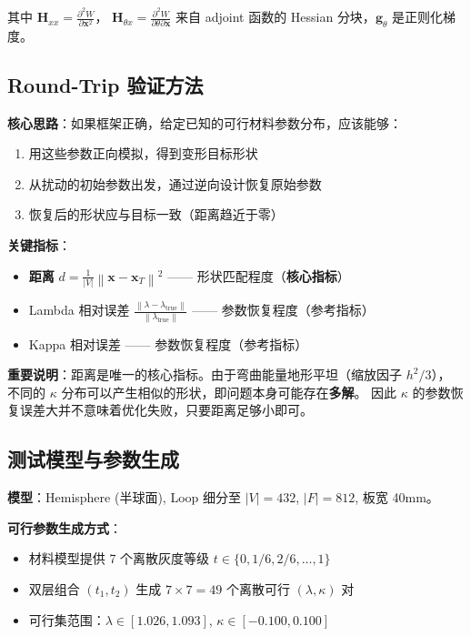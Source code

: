 \documentclass[12pt,a4paper]{article}
\newcommand{\norm}[1]{\left\|#1\right\|}
\begin{document}
其中 $\mathbf{H}_{xx} = \frac{\partial^2 W}{\partial \mathbf{x}^2}$，
$\mathbf{H}_{\theta x} = \frac{\partial^2 W}{\partial \theta \partial \mathbf{x}}$
来自 adjoint 函数的 Hessian 分块，$\mathbf{g}_\theta$ 是正则化梯度。

\subsection{Round-Trip 验证方法}

\textbf{核心思路}：如果框架正确，给定已知的可行材料参数分布，应该能够：
\begin{enumerate}
    \item 用这些参数正向模拟，得到变形目标形状
    \item 从扰动的初始参数出发，通过逆向设计恢复原始参数
    \item 恢复后的形状应与目标一致（距离趋近于零）
\end{enumerate}

\textbf{关键指标}：
\begin{itemize}
    \item \textbf{距离} $d = \frac{1}{|V|}\norm{\mathbf{x} - \mathbf{x}_T}^2$ —— 形状匹配程度（\textbf{核心指标}）
    \item Lambda 相对误差 $\frac{\norm{\lambda - \lambda_\text{true}}}{\norm{\lambda_\text{true}}}$ —— 参数恢复程度（参考指标）
    \item Kappa 相对误差 —— 参数恢复程度（参考指标）
\end{itemize}

\begin{framed}
\noindent \textbf{重要说明}：距离是唯一的核心指标。由于弯曲能量地形平坦（缩放因子 $h^2/3$），
不同的 $\kappa$ 分布可以产生相似的形状，即问题本身可能存在\textbf{多解}。
因此 $\kappa$ 的参数恢复误差大并不意味着优化失败，只要距离足够小即可。
\end{framed}

\subsection{测试模型与参数生成}

\textbf{模型}：Hemisphere (半球面), Loop 细分至 $|V|=432$, $|F|=812$, 板宽 40mm。

\textbf{可行参数生成方式}：
\begin{itemize}
    \item 材料模型提供 7 个离散灰度等级 $t \in \{0, 1/6, 2/6, \ldots, 1\}$
    \item 双层组合 $(t_1, t_2)$ 生成 $7 \times 7 = 49$ 个离散可行 $(\lambda, \kappa)$ 对
    \item 可行集范围：$\lambda \in [1.026, 1.093]$, $\kappa \in [-0.100, 0.100]$
\end{itemize}
\end{document}

